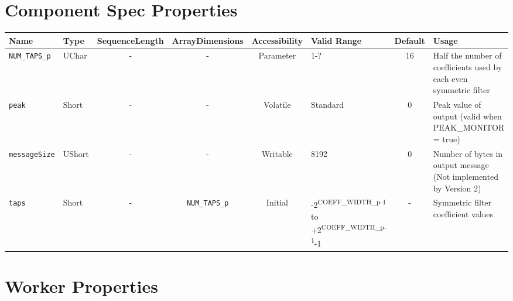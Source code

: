 \begin{landscape}
	\section*{Component Spec Properties}
	\begin{scriptsize}
		\begin{tabular}{|p{1.5cm}|p{1cm}|c|c|c|p{3cm}|c|p{7cm}|}
			\hline
			\rowcolor{blue}
			Name               & Type   & SequenceLength & ArrayDimensions   & Accessibility       & Valid Range                                                                      & Default & Usage                                                                        \\
			\hline
			\verb+NUM_TAPS_p+  & UChar  & -              & -                 & Parameter & 1-?                                                                              & 16      & Half the number of coefficients used by each           even symmetric filter \\
			\hline
			\verb+peak+        & Short  & -              & -                 & Volatile            & Standard                                                                         & 0       & Peak value of output (valid when PEAK\_MONITOR = true) \\
			\hline
			\verb+messageSize+ & UShort & -              & -                 & Writable & 8192                                                                             & 0       & Number of bytes in output message (Not implemented by Version 2)
			 \\
			\hline
			\verb+taps+        & Short  & -              & \verb+NUM_TAPS_p+ & Initial & -2\textsuperscript{COEFF\_WIDTH\_p-1} to +2\textsuperscript{COEFF\_WIDTH\_p-1}-1 & -       & Symmetric filter coefficient values                                          \\
			\hline
		\end{tabular}
	\end{scriptsize}

	\section*{Worker Properties}

\end{landscape}

